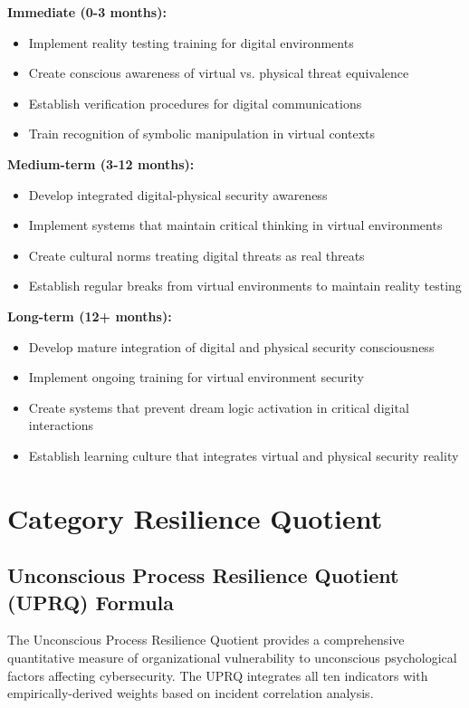 \documentclass[11pt,a4paper]{article}
\begin{document}
\textbf{Immediate (0-3 months):}
\begin{itemize}
\item Implement reality testing training for digital environments
\item Create conscious awareness of virtual vs. physical threat equivalence
\item Establish verification procedures for digital communications
\item Train recognition of symbolic manipulation in virtual contexts
\end{itemize}

\textbf{Medium-term (3-12 months):}
\begin{itemize}
\item Develop integrated digital-physical security awareness
\item Implement systems that maintain critical thinking in virtual environments
\item Create cultural norms treating digital threats as real threats
\item Establish regular breaks from virtual environments to maintain reality testing
\end{itemize}

\textbf{Long-term (12+ months):}
\begin{itemize}
\item Develop mature integration of digital and physical security consciousness
\item Implement ongoing training for virtual environment security
\item Create systems that prevent dream logic activation in critical digital interactions
\item Establish learning culture that integrates virtual and physical security reality
\end{itemize}

\section{Category Resilience Quotient}

\subsection{Unconscious Process Resilience Quotient (UPRQ) Formula}

The Unconscious Process Resilience Quotient provides a comprehensive quantitative measure of organizational vulnerability to unconscious psychological factors affecting cybersecurity. The UPRQ integrates all ten indicators with empirically-derived weights based on incident correlation analysis.
\end{document}
